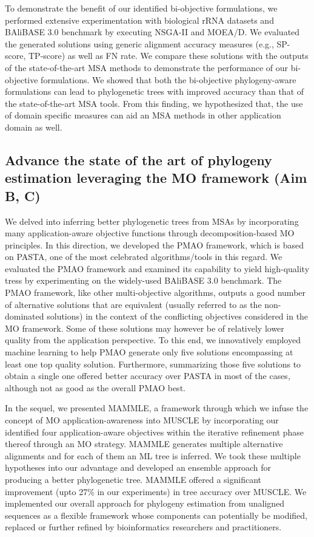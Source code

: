 To demonstrate the benefit of our identified bi-objective formulations, we performed extensive experimentation with biological rRNA datasets and BAliBASE 3.0 benchmark by executing NSGA-II and MOEA/D. We evaluated the generated solutions using generic alignment accuracy measures (e.g., SP-score, TP-score) as well as FN rate. We compare these solutions with the outputs of the state-of-the-art MSA methods to demonstrate the performance of our bi-objective formulations. We showed that both the bi-objective phylogeny-aware formulations can lead to phylogenetic trees with improved accuracy than that of the state-of-the-art MSA tools. From this finding, we hypothesized that, the use of domain specific measures can aid an MSA methods in other application domain as well.

\subsection{Advance the state of the art of phylogeny estimation leveraging the MO framework (Aim B, C)}
We delved into inferring better phylogenetic trees from MSAs by incorporating many application-aware objective functions through decomposition-based MO principles. In this direction, we developed the PMAO framework, which is based on PASTA, one of the most celebrated algorithms/tools in this regard. We evaluated the PMAO framework and examined its capability to yield high-quality tress by experimenting on the widely-used BAliBASE 3.0 benchmark. The PMAO framework, like other multi-objective algorithms, outputs a good number of alternative solutions that are equivalent (usually referred to as the non-dominated solutions) in the context of the conflicting objectives considered in the MO framework. Some of these solutions may however be of relatively lower quality from the application perspective. To this end, we innovatively employed machine learning to help PMAO generate only five solutions encompassing at least one top quality solution. Furthermore, summarizing those five solutions to obtain a single one offered better accuracy over PASTA in most of the cases, although not as good as the overall PMAO best.

In the sequel, we presented MAMMLE, a framework through which we infuse the concept of MO application-awareness into MUSCLE by incorporating our identified four application-aware objectives within the iterative refinement phase thereof through an MO strategy. MAMMLE generates multiple alternative alignments and for each of them an ML tree is inferred. We took these multiple hypotheses into our advantage and developed an ensemble approach for producing a better phylogenetic tree. MAMMLE offered a significant improvement (upto 27\% in our experiments) in tree accuracy over MUSCLE. We implemented our overall approach for phylogeny estimation from unaligned sequences as a flexible framework whose components can potentially be modified, replaced or further refined by bioinformatics researchers and practitioners.

